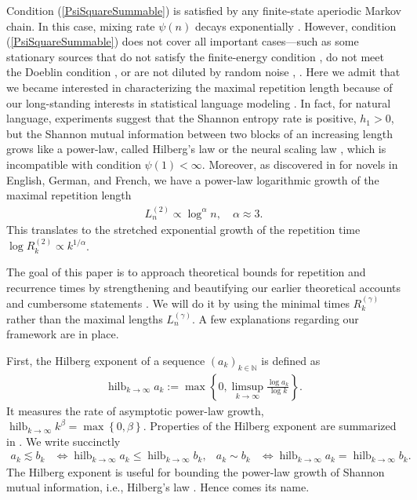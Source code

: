 \documentclass[a4paper,12pt]{article}
\newcommand{\klam}[1]{\left\{ #1 \right\}}
\DeclareMathOperator*{\hilberg}{hilb}
\begin{document}
Condition (\ref{PsiSquareSummable}) is satisfied by any finite-state
aperiodic Markov chain. In this case, mixing rate $\psi(n)$ decays
exponentially \cite[Theorems 3.1]{Bradley05}. However, condition
(\ref{PsiSquareSummable}) does not cover all important cases---such as
some stationary sources that do not satisfy the finite-energy
condition \cite{Shields92b,Shields97}, do not meet the Doeblin
condition \cite[Theorem 11.7]{Debowski21}, or are not diluted by
random noise \cite{Shields97}, \cite[Theorem 11.6]{Debowski21}. Here
we admit that we became interested in characterizing the maximal
repetition length because of our long-standing interests in
statistical language modeling \cite{Debowski21}.  In fact, for natural
language, experiments suggest that the Shannon entropy rate is
positive, $h_1>0$, \cite{Shannon51,CoverKing78} but the Shannon mutual
information between two blocks of an increasing length grows like a
power-law, called Hilberg's law or the neural scaling law
\cite{Hilberg90, TakahiraOther16, KaplanOther20, Debowski21}, which
is incompatible with condition $\psi(1)<\infty$. Moreover, as
discovered in \cite{Debowski12b,Debowski15f} for novels in English,
German, and French, we have a power-law logarithmic growth of the
maximal repetition length
\begin{align}
  L^{(2)}_n\propto \log^\alpha n,\quad \alpha\approx 3.
\end{align}
This translates to the stretched exponential growth of the repetition
time
$\log R^{(2)}_k\propto k^{1/\alpha}$.

The goal of this paper is to approach theoretical bounds for
repetition and recurrence times by strengthening and beautifying our
earlier theoretical accounts and cumbersome statements
\cite{Debowski15f,Debowski18b,Debowski21}. We will do it by using the
minimal times $R^{(\gamma)}_k$ rather than the maximal lengths
$L^{(\gamma)}_n$.  A few explanations regarding our framework are in
place.

First, the Hilberg exponent of a sequence $(a_k)_{k\in\mathbb{N}}$ is
defined as
\begin{align}
  \label{Exponent}
  \hilberg_{k\rightarrow\infty} a_k
  :=\max\klam{0,\limsup_{k\rightarrow\infty} \frac{\log
  a_k}{\log k}}
  .
\end{align}
It measures the rate of asymptotic power-law growth,
$\hilberg_{k\rightarrow\infty} k^\beta=\max\klam{0,\beta}$.
Properties of the Hilberg exponent are summarized in \cite[Section
8.1]{Debowski21}. We write succinctly
\begin{align}
  a_k\lesssim b_k&\iff
  \hilberg_{k\rightarrow\infty} a_k\le
  \hilberg_{k\rightarrow\infty} b_k,
  &
  a_k\sim b_k&\iff
  \hilberg_{k\rightarrow\infty} a_k=
  \hilberg_{k\rightarrow\infty} b_k.
\end{align}
The Hilberg exponent is useful for bounding the power-law growth of
Shannon mutual information, i.e., Hilberg's law \cite[Chapter
8]{Debowski21}. Hence comes its name.
\end{document}
